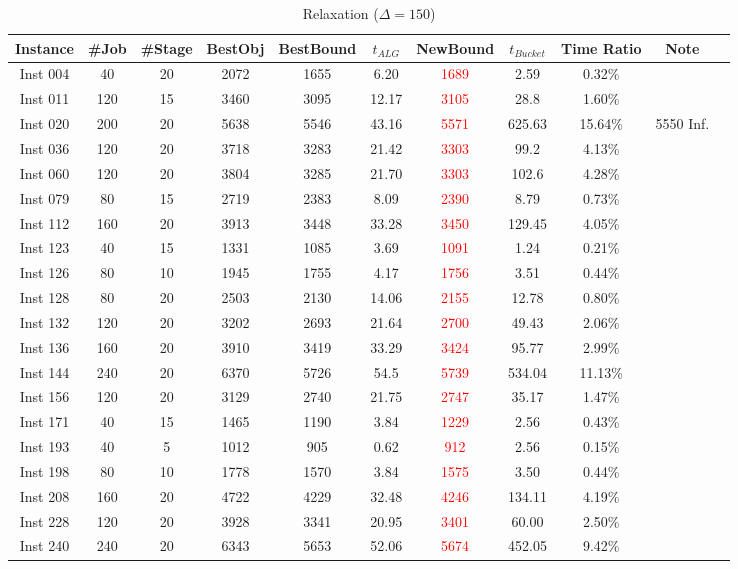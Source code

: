 \documentclass[11pt]{article}
\begin{document}
\begin{table}[ht]
    \centering
    \begin{tabular}{c|c|c|c|c|c||c|c|c|c|c}
        Instance & \#Job & \#Stage & BestObj & BestBound & $t_{ALG}$ & NewBound & $t_{Bucket}$ & Time Ratio & Note\\
        \midrule
        Inst 004 & 40 & 20 & 2072 & 1655 & 6.20 & \textcolor{red}{1689} & 2.59 & 0.32\% &\\
        Inst 011 & 120 & 15 & 3460 & 3095 & 12.17 & \textcolor{red}{3105} & 28.8 & 1.60\% & \\
        Inst 020 & 200 & 20 & 5638 & 5546 & 43.16 & \textcolor{red}{5571} & 625.63 & 15.64\% & 5550 Inf.\\
        Inst 036 & 120 & 20 & 3718 & 3283 & 21.42 & \textcolor{red}{3303} & 99.2 & 4.13\% & \\
        Inst 060 & 120 & 20 & 3804 & 3285 & 21.70 & \textcolor{red}{3303} & 102.6 & 4.28\% & \\
        Inst 079 & 80 & 15 & 2719 & 2383 & 8.09 & \textcolor{red}{2390} & 8.79 & 0.73\% & \\
        Inst 112 & 160 & 20 & 3913 & 3448 & 33.28 & \textcolor{red}{3450} & 129.45 & 4.05\% & \\
        Inst 123 & 40 & 15 & 1331 & 1085 & 3.69 & \textcolor{red}{1091} & 1.24 & 0.21\% & \\
        Inst 126 & 80 & 10 & 1945 & 1755 & 4.17 & \textcolor{red}{1756} & 3.51 & 0.44\% & \\
        Inst 128 & 80 & 20 & 2503 & 2130 & 14.06 & \textcolor{red}{2155} & 12.78 & 0.80\% & \\
        Inst 132 & 120 & 20 & 3202 & 2693 & 21.64 & \textcolor{red}{2700} & 49.43 & 2.06\% & \\
        Inst 136 & 160 & 20 & 3910 & 3419 & 33.29 & \textcolor{red}{3424} & 95.77 & 2.99\% & \\
        Inst 144 & 240 & 20 & 6370 & 5726 & 54.5 & \textcolor{red}{5739} & 534.04 & 11.13\% & \\
        Inst 156 & 120 & 20 & 3129 & 2740 & 21.75 & \textcolor{red}{2747} & 35.17 & 1.47\% & \\
        Inst 171 & 40 & 15 & 1465 & 1190 & 3.84 & \textcolor{red}{1229} & 2.56 & 0.43\% & \\
        Inst 193 & 40 & 5 & 1012 & 905 & 0.62 & \textcolor{red}{912} & 2.56 & 0.15\% & \\
        Inst 198 & 80 & 10 & 1778 & 1570 & 3.84 & \textcolor{red}{1575} & 3.50 & 0.44\% & \\
        Inst 208 & 160 & 20 & 4722 & 4229 & 32.48 & \textcolor{red}{4246} & 134.11 & 4.19\% & \\
        Inst 228 & 120 & 20 & 3928 & 3341 & 20.95 & \textcolor{red}{3401} & 60.00 & 2.50\% & \\
        Inst 240 & 240 & 20 & 6343 & 5653 & 52.06 & \textcolor{red}{5674} & 452.05 & 9.42\% & \\
    \end{tabular}
    \caption{Relaxation ($\Delta = 150$)}
    \label{tab:placeholder}
\end{table}
\end{document}
